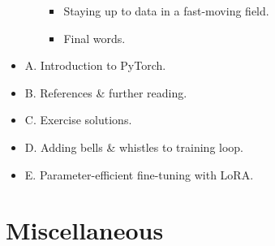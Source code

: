 \documentclass{article}
\begin{document}
\begin{itemize}
\begin{itemize}
\begin{itemize}
			\item {\sf Staying up to data in a fast-moving field.}
			\item {\sf Final words.}
		\end{itemize}
	\end{itemize}
	\item {\sf A. Introduction to PyTorch.}
	\item {\sf B. References \& further reading.}
	\item {\sf C. Exercise solutions.}
	\item {\sf D. Adding bells \& whistles to training loop.}
	\item {\sf E. Parameter-efficient fine-tuning with LoRA.}
\end{itemize}


\section{Miscellaneous}


\printbibliography[heading=bibintoc]
	
\end{document}
